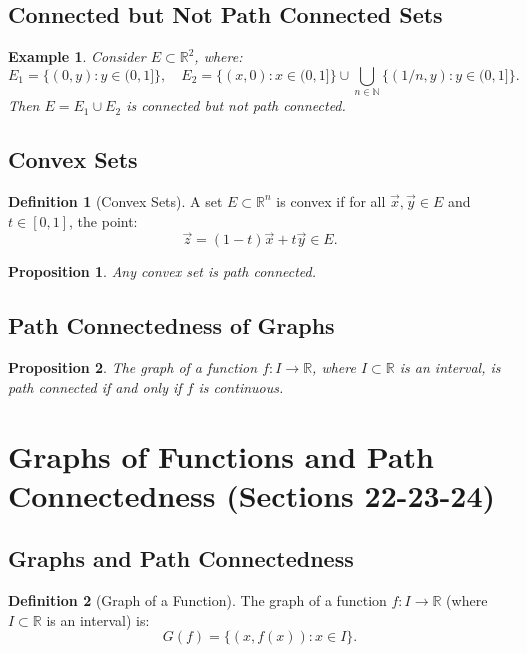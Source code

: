 \documentclass[9pt]{article}
\theoremstyle{definition}
\newtheorem{definition}{Definition}
\theoremstyle{plain}
\newtheorem{proposition}{Proposition}
\newtheorem{example}{Example}
\begin{document}
\subsection*{Connected but Not Path Connected Sets}
\begin{example}
Consider \( E \subset \mathbb{R}^2 \), where:
\[
E_1 = \{(0, y) : y \in (0, 1]\}, \quad
E_2 = \{(x, 0) : x \in (0, 1]\} \cup \bigcup_{n \in \mathbb{N}} \{(1/n, y) : y \in (0, 1]\}.
\]
Then \( E = E_1 \cup E_2 \) is connected but not path connected.
\end{example}

\subsection*{Convex Sets}
\begin{definition}[Convex Sets]
A set \( E \subset \mathbb{R}^n \) is convex if for all \( \vec{x}, \vec{y} \in E \) and \( t \in [0, 1] \), the point:
\[
\vec{z} = (1-t)\vec{x} + t\vec{y} \in E.
\]
\end{definition}

\begin{proposition}
Any convex set is path connected.
\end{proposition}

\subsection*{Path Connectedness of Graphs}
\begin{proposition}
The graph of a function \( f : I \to \mathbb{R} \), where \( I \subset \mathbb{R} \) is an interval, is path connected if and only if \( f \) is continuous.
\end{proposition}
\section*{Graphs of Functions and Path Connectedness (Sections 22-23-24)}

\subsection*{Graphs and Path Connectedness}
\begin{definition}[Graph of a Function]
The graph of a function \( f : I \to \mathbb{R} \) (where \( I \subset \mathbb{R} \) is an interval) is:
\[
G(f) = \{(x, f(x)) : x \in I\}.
\]
\end{definition}
\end{document}
